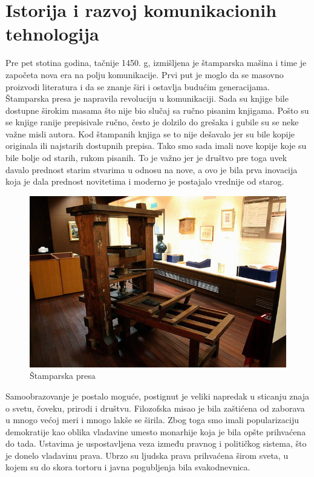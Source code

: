 \documentclass[10pt]{article}
\begin{document}
    \section{Istorija i razvoj komunikacionih tehnologija}
    
    Pre pet stotina godina, tačnije 1450. g, izmišljena je štamparska mašina i time je započeta nova era na polju komunikacije. Prvi put je moglo da se masovno proizvodi literatura i da se znanje širi i ostavlja budućim generacijama. Štamparska presa je napravila revoluciju u komunikaciji. Sada su knjige bile dostupne širokim masama što nije bio slučaj sa ručno pisanim knjigama. Pošto su se knjige ranije prepisivale ručno, često je dolzilo do grešaka i gubile su se neke važne misli autora. Kod štampanih knjiga se to nije dešavalo jer su bile kopije originala ili najstarih dostupnih prepisa. Tako smo sada imali nove kopije koje su bile bolje od starih, rukom pisanih. To je važno jer je društvo pre toga uvek davalo prednost starim stvarima u odnosu na nove, a ovo je bila prva inovacija koja je dala prednost novitetima i moderno je postajalo vrednije od starog.
    
\begin{figure}
    \centering
    \includegraphics[scale=0.4]{stamparska-presa.jpg}
    \caption{Štamparska presa}
\end{figure}


	Samoobrazovanje je postalo moguće, postignut je veliki napredak u sticanju znaja o svetu, čoveku, prirodi i društvu. Filozofska misao je bila zaštićena od zaborava u mnogo većoj meri i mnogo lakše se širila. Zbog toga smo imali popularizaciju demokratije kao oblika vladavine umesto monarhije koja je bila opšte prihvaćena do tada. Ustavima je uspostavljena veza između pravnog i političkog sistema, što je donelo vladavinu prava. Ubrzo su ljudska prava prihvaćena širom sveta, u kojem su do skora tortoru i javna pogubljenja bila svakodnevnica. 
	
\end{document}
